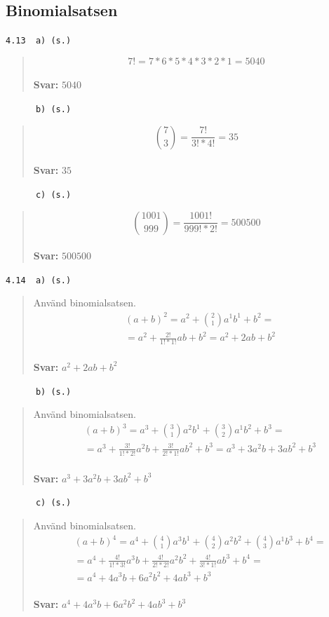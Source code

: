 \documentclass[a4paper]{article}
\newcommand{\tskcol}[1]{\textcolor{tskcol}{#1}}
\begin{document}
	\subsection*{Binomialsatsen}
	
	\texttt{\tskcol{4.13~~a) (s.)}}
	\begin{quotation}
		\noindent
		\[7!=7*6*5*4*3*2*1=5040\]
		\\
		\textbf{Svar:} $5040$
	\end{quotation}
	
	\texttt{\tskcol{~~~~~~b) (s.)}}
	\begin{quotation}
		\noindent
		\[{7 \choose 3}=\frac{7!}{3!*4!}=35\]
		\\
		\textbf{Svar:} $35$
	\end{quotation}
	
	\texttt{\tskcol{~~~~~~c) (s.)}}
	\begin{quotation}
		\noindent
		\[{1001 \choose 999}=\frac{1001!}{999!*2!}=500500\]
		\\
		\textbf{Svar:} $500500$
	\end{quotation}
	
	\texttt{\tskcol{4.14~~a) (s.)}}
	\begin{quotation}
		\noindent
		Använd binomialsatsen.
		\begin{align*}
		&(a+b)^2=
		a^2+{2 \choose 1}a^1b^1+b^2= \\
		&=a^2+\frac{2!}{1!*1!}ab+b^2=
		a^2+2ab+b^2
		\end{align*}
		\\
		\textbf{Svar:} $a^2+2ab+b^2$
	\end{quotation}
	
	\texttt{\tskcol{~~~~~~b) (s.)}}
	\begin{quotation}
		\noindent
		Använd binomialsatsen.
		\begin{align*}
		&(a+b)^3=
		a^3+{3 \choose 1}a^2b^1+{3 \choose 2}a^1b^2+b^3= \\
		&=a^3+\frac{3!}{1!*2!}a^2b+\frac{3!}{2!*1!}ab^2+b^3=
		a^3+3a^2b+3ab^2+b^3
		\end{align*}
		\\
		\textbf{Svar:} $a^3+3a^2b+3ab^2+b^3$
	\end{quotation}
	
	\texttt{\tskcol{~~~~~~c) (s.)}}
	\begin{quotation}
		\noindent
		Använd binomialsatsen.
		\begin{align*}
		&(a+b)^4=
		a^4+{4 \choose 1}a^3b^1+{4 \choose 2}a^2b^2+{4 \choose 3}a^1b^3+b^4= \\
		&=a^4+\frac{4!}{1!*3!}a^3b+\frac{4!}{2!*2!}a^2b^2+\frac{4!}{3!*1!}ab^3+b^4=\\
		&=a^4+4a^3b+6a^2b^2+4ab^3+b^3
		\end{align*}
		\\
		\textbf{Svar:} $a^4+4a^3b+6a^2b^2+4ab^3+b^3$
	\end{quotation}
	
\end{document}
